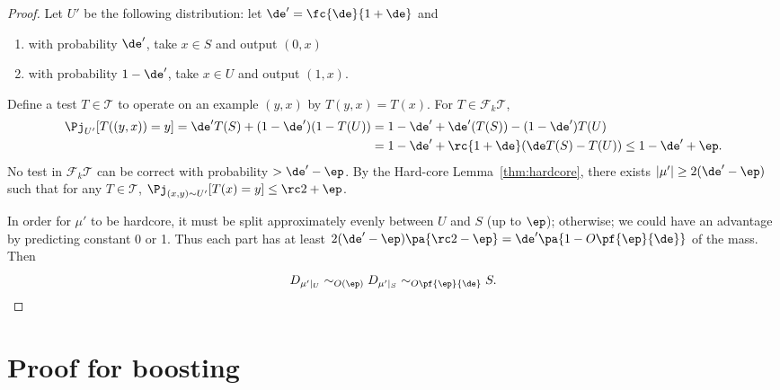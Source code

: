 \begin{proof}
Let $U'$ be the following distribution: let $\de'=\fc{\de}{1+\de}$ and 
\begin{enumerate}
\item
with probability $\de'$, take $x\in S$ and output $(0,x)$
\item
with probability $1-\de'$, take $x\in U$ and output $(1,x)$.
\end{enumerate}
Define a test $T\in \mathcal T$ to operate on an example $(y, x)$ by $T(y,x)=T(x)$. For $T\in \mathcal F_k \mathcal T$, 
\begin{align}
\Pj_{U'}[T((y,x))=y] = 
\de' T(S) + (1-\de') (1-T(U))
&= 1-\de' + \de' (T(S)) - (1-\de') T(U)\\
&= 1-\de' + \rc{1+\de} (\de T(S) - T(U))\le 1-\de'+\ep.
\end{align}
No test in $\mathcal F_k \mathcal T$ can be correct with probability $>\de'-\ep$. By the Hard-core Lemma~\ref{thm:hardcore}, there exists $|\mu'|\ge 2(\de'-\ep)$ such that for any $T\in \mathcal T$, $\Pj_{(x,y) \sim U'}[T(x)=y]\le  \rc2+\ep$.

In order for $\mu'$ to be hardcore, it must be split approximately evenly between $U$ and $S$ (up to $\ep$); otherwise; we could have an advantage by predicting constant 0 or 1. 
Thus each part has at least $2(\de'-\ep) \pa{\rc 2 - \ep} = \de'\pa{1-O\pf{\ep}{\de}}$ of the mass. Then
$$D_{\mu'|_U}\sim_{O(\ep)} D_{\mu'|_S}\sim_{O\pf{\ep}{\de}} S.$$
\end{proof}

\section{Proof for boosting}

